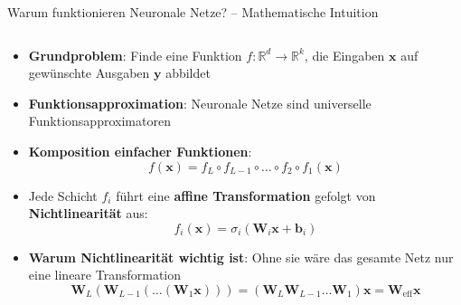 \documentclass[aspectratio=1610, xcolor=dvipsnames, 9pt]{beamer}
\begin{document}
\begin{frame}{Warum funktionieren Neuronale Netze? -- Mathematische Intuition}
  \begin{columns}
    \begin{column}{1\textwidth}
      \begin{itemize}
        \item \textbf{Grundproblem}: Finde eine Funktion $f: \mathbb{R}^d \to \mathbb{R}^k$, die Eingaben $\mathbf{x}$ auf gewünschte Ausgaben $\mathbf{y}$ abbildet
        \item \textbf{Funktionsapproximation}: Neuronale Netze sind universelle Funktionsapproximatoren
        \item \textbf{Komposition einfacher Funktionen}: 
        \begin{equation}
          f(\mathbf{x}) = f_L \circ f_{L-1} \circ \ldots \circ f_2 \circ f_1(\mathbf{x})
        \end{equation}
        \item Jede Schicht $f_i$ führt eine \textbf{affine Transformation} gefolgt von \textbf{Nichtlinearität} aus:
        \begin{equation}
          f_i(\mathbf{x}) = \sigma_i(\mathbf{W}_i \mathbf{x} + \mathbf{b}_i)
        \end{equation}
        \item \textbf{Warum Nichtlinearität wichtig ist}: Ohne sie wäre das gesamte Netz nur eine lineare Transformation
        \begin{equation}
          \mathbf{W}_L(\mathbf{W}_{L-1}(\ldots(\mathbf{W}_1 \mathbf{x}))) = (\mathbf{W}_L \mathbf{W}_{L-1} \ldots \mathbf{W}_1) \mathbf{x} = \mathbf{W}_{\text{eff}} \mathbf{x}
        \end{equation}
      \end{itemize}
    \end{column}
  \end{columns}
\end{frame}
\end{document}
